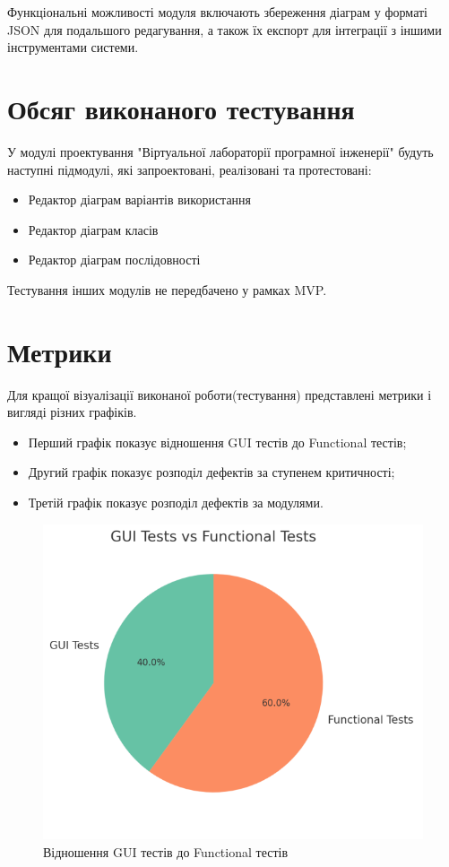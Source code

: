 \documentclass[oneside,14pt]{extarticle}
\begin{document}
\begin{normalsize}
	Функціональні можливості модуля включають збереження діаграм у форматі JSON для подальшого редагування, а також їх експорт для інтеграції з іншими інструментами системи.
	
	\section{Обсяг виконаного тестування}
	У модулі проектування "Віртуальної лабораторії програмної інженерії" будуть наступні підмодулі, які запроектовані, реалізовані та протестовані:
	\begin{itemize}
		\item Редактор діаграм варіантів використання
		\item Редактор діаграм класів
		\item Редактор діаграм послідовності
	\end{itemize}
	
	Тестування інших модулів не передбачено у рамках MVP.
	
	\section{Метрики}
	Для кращої візуалізації виконаної роботи(тестування) представлені
	метрики і вигляді різних графіків. 
	
	\begin{itemize}
		\item Перший графік показує відношення GUI тестів до  Functional  тестів;
		\item Другий графік показує розподіл дефектів за ступенем критичності;
		\item Третій графік показує розподіл дефектів за модулями.
	\end{itemize}
	
	\begin{figure}[H]
		\centering
		\includegraphics[width=0.7\columnwidth]{1}
		\caption{Відношення GUI тестів до  Functional  тестів}
	\end{figure}
	

\end{normalsize}
\end{document}
